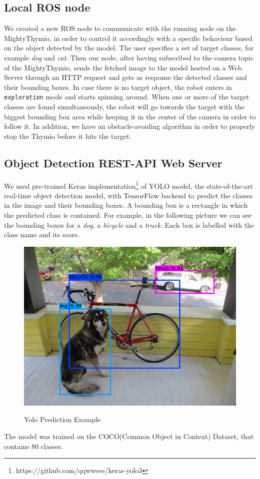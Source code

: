 \documentclass[letterpaper, 10 pt, conference]{ieeeconf}  %
\begin{document}
\subsection*{Local ROS node}
We created a new ROS node to communicate with the running node on the MightyThymio, in order to control it accordingly with a specific behaviour based on the object detected by the model. The user specifies a set of target classes, for example \emph{dog} and \emph{cat}. Then our node, after having subscribed to the camera topic of the MightyThymio, sends the fetched image to the model hosted on a Web  Server through an HTTP request and gets as response the detected classes and their bounding boxes. In case there is no target object, the robot enters in \texttt{exploration} mode and starts spinning around. When one or more of the target classes are found simultaneously, the robot will go towards the target with the biggest bounding box area while keeping it in the center of the camera in order to follow it. In addition, we have an obstacle-avoiding algorithm in order to properly stop the Thymio before it hits the target.

\subsection*{Object Detection REST-API Web Server}
We used pre-trained Keras implementation\footnote{https://github.com/qqwweee/keras-yolo3} of YOLO\cite{DBLP:conf/cvpr/RedmonDGF16} model, the state-of-the-art real-time object detection model, with TensorFlow\cite{tensorflow2015-whitepaper} backend to predict the classes in the image and their bounding boxes. A bounding box is a rectangle in which the predicted class is contained. For example, in the following picture we can see the bounding boxes for a \emph{dog}, a \emph{bicycle} and a \emph{truck}. Each box is labelled with the class name and its score.
\begin{figure}[H]
\centering
\includegraphics[width=\linewidth]{images/yolo-example}
\label{fig: yolo-example}
\caption{Yolo Prediction Example}
\end{figure}
The model was trained on the COCO(Common Object in Context)\cite{COCO} Dataset, that contains 80 classes. 
\end{document}
